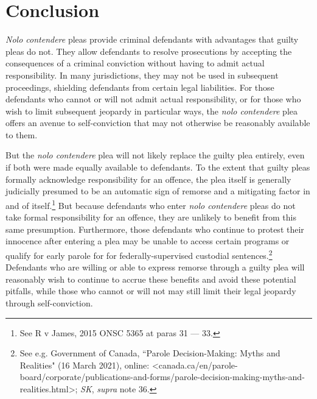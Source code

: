 \chapter{Conclusion}

\setcounter{footnote}{247}

\textit{Nolo contendere} pleas provide criminal defendants with advantages that guilty pleas do not. They allow defendants to resolve prosecutions by accepting the consequences of a criminal conviction without having to admit actual responsibility. In many jurisdictions, they may not be used in subsequent proceedings, shielding defendants from certain legal liabilities. For those defendants who cannot or will not admit actual responsibility, or for those who wish to limit subsequent jeopardy in particular ways, the \textit{nolo contendere} plea offers an avenue to self-conviction that may not otherwise be reasonably available to them.

But the \textit{nolo contendere} plea will not likely replace the guilty plea entirely, even if both were made equally available to defendants. To the extent that guilty pleas formally acknowledge responsibility for an offence, the plea itself is generally judicially presumed to be an automatic sign of remorse and a mitigating factor in and of itself.\footnote{See R v James, 2015 ONSC 5365 at paras 31 — 33.} But because defendants who enter \textit{nolo contendere} pleas do not take formal responsibility for an offence, they are unlikely to benefit from this same presumption. Furthermore, those defendants who continue to protest their innocence after entering a plea may be unable to access certain programs or qualify for early parole for for federally-supervised custodial sentences.\footnote{See e.g. Government of Canada, ``Parole Decision-Making: Myths and Realities" (16 March 2021), online: \textless canada.ca/en/parole-board/corporate/publications-and-forms/parole-decision-making-myths-and-realities.html\textgreater; \textit{SK}, \textit{supra} note 36.} Defendants who are willing or able to express remorse through a guilty plea will reasonably wish to continue to accrue these benefits and avoid these potential pitfalls, while those who cannot or will not may still limit their legal jeopardy through self-conviction.

